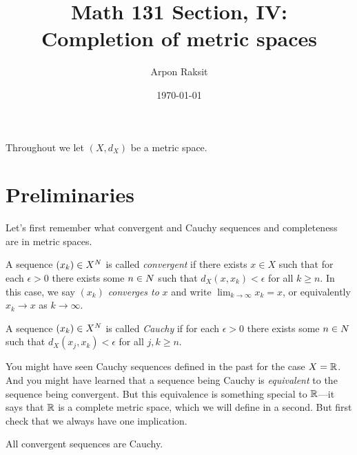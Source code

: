 


\title{Math 131 Section, IV:\\Completion of metric spaces}
\author{Arpon Raksit}
\date{\today}


\maketitle
\thispagestyle{fancy}


\begin{notation}
  Throughout we let $(X,d_X)$ be a metric space.
\end{notation}

\section{Preliminaries}

Let's first remember what convergent and Cauchy sequences and
completeness are in metric spaces.

\begin{definition}
  A sequence $(x_k) \in X^N$ is called \textit{convergent} if there
  exists $x \in X$ such that for each $\epsilon > 0$ there exists some
  $n \in N$ such that $d_X(x,x_k) < \epsilon$ for all $k \ge n$. In
  this case, we say $(x_k)$ \textit{converges to} $x$ and write
  $\lim_{k \to \infty} x_k = x$, or equivalently $x_k \to x$ as $k \to
  \infty$.
\end{definition}

\begin{definition}
  A sequence $(x_k) \in X^N$ is called \textit{Cauchy} if for each
  $\epsilon > 0$ there exists some $n \in N$ such that $d_X(x_j,x_k)
  < \epsilon$ for all $j,k \ge n$.
\end{definition}

You might have seen Cauchy sequences defined in the past for the case
$X = \mathbb{R}$. And you might have learned that a sequence being Cauchy is
\textit{equivalent} to the sequence being convergent. But this
equivalence is something special to $\mathbb{R}$---it says that $\mathbb{R}$ is a
complete metric space, which we will define in a second. But first
check that we always have one implication.

\begin{exercise}
  \label{convergentcauchy}
  All convergent sequences are Cauchy.
\end{exercise}

